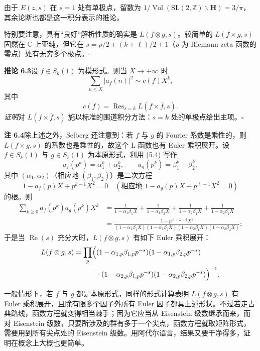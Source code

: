 由于 $E(z,s)$ 在 $s=1$ 处有单极点，留数为 $1/\operatorname{Vol}(\mathrm{SL}(2,\mathbb{Z})\backslash\mathbf{H})=3/\pi$，其余论断也都是这一积分表示的推论。

特别要注意，具有“良好”解析性质的确实是 $L(f\otimes g,s)$。较简单的 $L(f\times g,s)$ 固然在 $\mathbb{C}$ 上亚纯，但它在 $s=\rho/2+(k+\ell)/2+1$（$\rho$ 为 Riemann zeta 函数的零点）处有无穷多个极点。\hfill$\square$

\par\medskip\noindent\textbf{推论 6.3}\quad 设 $f\in S_{k}(1)$ 为模形式。则当 $X\to+\infty$ 时
\[
\sum_{n\le X}|a_{f}(n)|^{2}\sim c(f)X^{k},
\]
其中
\[
c(f)=\operatorname{Res}_{s=k}L(f\times\bar f,s).
\]
\emph{证明}\quad 对 $L(f\times\bar f,s)$ 施以标准的围道积分方法：$s=k$ 处的单极点给出主项。\hfill$\square$

\par\medskip\noindent\textbf{注 6.4}\quad 除上述之外，Selberg 还注意到：若 $f$ 与 $g$ 的 Fourier 系数是乘性的，则 $L(f\times g,s)$ 的系数也是乘性的，故这个 L 函数也有 Euler 乘积展开。设 $f\in S_{k}(1)$ 与 $g\in S_{\ell}(1)$ 为本原形式，利用 (5.4) 写作
\[
a_{f}(p^{k})=\alpha_{1}^{k}+\alpha_{2}^{k},\qquad a_{g}(p^{k})=\beta_{1}^{k}+\beta_{2}^{k},
\]
其中 $(\alpha_{1},\alpha_{2})$（相应地 $(\beta_{1},\beta_{2})$）是二次方程
\[
1-a_{f}(p)X+p^{k-1}X^{2}=0\quad(\text{相应地 }1-a_{g}(p)X+p^{\ell-1}X^{2}=0)
\]
的根。则
\begin{align*}
\sum_{k\ge0}a_{f}(p^{k})a_{g}(p^{k})X^{k}&=\frac{1}{1-\alpha_{1}\beta_{1}X}+\frac{1}{1-\alpha_{1}\beta_{2}X}+\frac{1}{1-\alpha_{2}\beta_{1}X}+\frac{1}{1-\alpha_{2}\beta_{2}X}\\
&=\frac{1-p^{\ell+k-2}X^{2}}{(1-\alpha_{1}\beta_{1}X)(1-\alpha_{1}\beta_{2}X)(1-\alpha_{2}\beta_{1}X)(1-\alpha_{2}\beta_{2}X)};
\end{align*}
于是当 $\operatorname{Re}(s)$ 充分大时，$L(f\otimes g,s)$ 有如下 Euler 乘积展开：
\begin{align*}
L(f\otimes g,s)=\prod_{p}\Bigl(&(1-\alpha_{1,p}\beta_{1,p}p^{-s})(1-\alpha_{1,p}\beta_{2,p}p^{-s})\\
&\cdot(1-\alpha_{2,p}\beta_{1,p}p^{-s})(1-\alpha_{2,p}\beta_{2,p}p^{-s})\Bigr)^{-1}.
\end{align*}

一般情形下，若 $f$ 与 $g$ 都是本原形式，同样的形式计算表明 $L(f\otimes g,s)$ 有 Euler 乘积展开，且除有限多个因子外所有 Euler 因子都具上述形状。不过若走古典路线，函数方程就变得相当棘手；因为它应当从 Eisenstein 级数继承而来，而对 Eisenstein 级数，只要所涉及的群有多于一个尖点，函数方程就取矩阵形式，需要用到所有尖点处的 Eisenstein 级数。用阿代尔语言，结果又要干净得多，证明在概念上大概也更简单。

